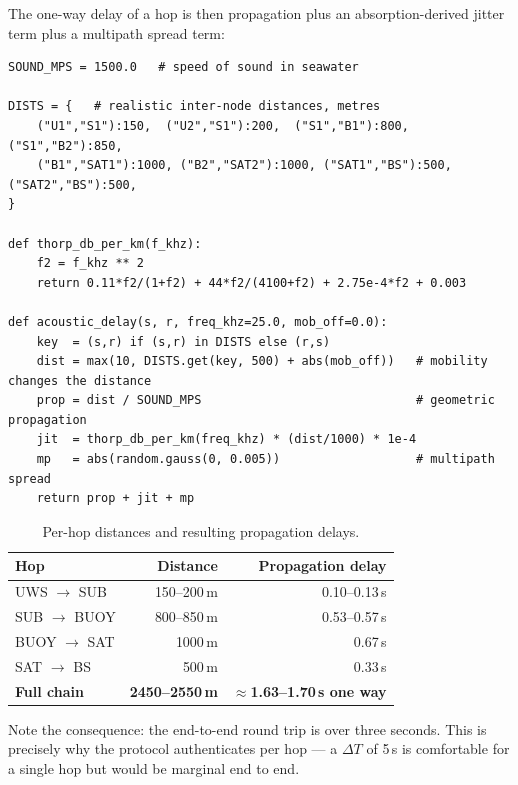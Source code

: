The one-way delay of a hop is then propagation plus an absorption-derived jitter term plus
a multipath spread term:

\begin{lstlisting}[style=py,caption={Physical delay model (lines 66--85).}]
SOUND_MPS = 1500.0   # speed of sound in seawater

DISTS = {   # realistic inter-node distances, metres
    ("U1","S1"):150,  ("U2","S1"):200,  ("S1","B1"):800,  ("S1","B2"):850,
    ("B1","SAT1"):1000, ("B2","SAT2"):1000, ("SAT1","BS"):500, ("SAT2","BS"):500,
}

def thorp_db_per_km(f_khz):
    f2 = f_khz ** 2
    return 0.11*f2/(1+f2) + 44*f2/(4100+f2) + 2.75e-4*f2 + 0.003

def acoustic_delay(s, r, freq_khz=25.0, mob_off=0.0):
    key  = (s,r) if (s,r) in DISTS else (r,s)
    dist = max(10, DISTS.get(key, 500) + abs(mob_off))   # mobility changes the distance
    prop = dist / SOUND_MPS                              # geometric propagation
    jit  = thorp_db_per_km(freq_khz) * (dist/1000) * 1e-4
    mp   = abs(random.gauss(0, 0.005))                   # multipath spread
    return prop + jit + mp
\end{lstlisting}

\begin{table}[H]
\centering
\caption{Per-hop distances and resulting propagation delays.}
\label{tab:delays}
\small
\begin{tabular}{@{}l r r@{}}
\toprule
\textbf{Hop} & \textbf{Distance} & \textbf{Propagation delay}\\
\midrule
UWS $\to$ SUB  & 150--200\,m & 0.10--0.13\,s\\
SUB $\to$ BUOY & 800--850\,m & 0.53--0.57\,s\\
BUOY $\to$ SAT & 1000\,m     & 0.67\,s\\
SAT $\to$ BS   & 500\,m      & 0.33\,s\\
\midrule
\textbf{Full chain} & \textbf{2450--2550\,m} & \textbf{$\approx$1.63--1.70\,s one way}\\
\bottomrule
\end{tabular}
\end{table}

Note the consequence: the end-to-end round trip is over three seconds. This is precisely why
the protocol authenticates per hop --- a $\Delta T$ of 5\,s is comfortable for a single hop
but would be marginal end to end.

